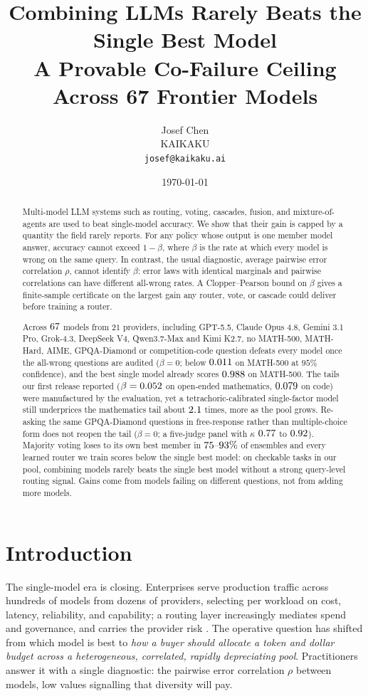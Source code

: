 \documentclass[11pt]{article}
\title{\bfseries Combining LLMs Rarely Beats the Single Best Model\\[4pt]
{\large\mdseries A Provable Co-Failure Ceiling Across 67 Frontier Models}}
\author{Josef Chen\\ KAIKAKU\\ \texttt{josef@kaikaku.ai}}
\date{\today}
\theoremstyle{plain}
\theoremstyle{definition}
\begin{document}
\maketitle

\begin{abstract}
Multi-model LLM systems such as routing, voting, cascades, fusion, and mixture-of-agents are used to beat single-model
accuracy. We show that their gain is capped by a quantity the field rarely reports. For any policy whose output is one
member model answer, accuracy cannot exceed $1-\beta$, where $\beta$ is the rate at which every model is wrong on the same
query. In contrast, the usual diagnostic, average pairwise error correlation $\rho$, cannot identify $\beta$: error laws
with identical marginals and pairwise correlations can have different all-wrong rates. A Clopper--Pearson bound on $\beta$
gives a finite-sample certificate on the largest gain any router, vote, or cascade could deliver before training a router.

Across $67$ models from $21$ providers, including GPT-5.5, Claude Opus 4.8, Gemini 3.1 Pro, Grok-4.3, DeepSeek V4,
Qwen3.7-Max and Kimi K2.7, no MATH-500, MATH-Hard, AIME, GPQA-Diamond or competition-code question defeats every model
once the all-wrong questions are audited ($\beta=0$; below $0.011$ on MATH-500 at $95\%$ confidence), and the best
single model already scores $0.988$ on MATH-500. The tails our first release reported ($\beta=0.052$ on
open-ended mathematics, $0.079$ on code) were manufactured by the evaluation, yet a tetrachoric-calibrated
single-factor model still underprices the mathematics tail about $2.1$ times, more as the pool grows. Re-asking
the same GPQA-Diamond questions in free-response rather than multiple-choice form does not reopen the tail ($\beta=0$; a
five-judge panel with $\kappa$ $0.77$ to $0.92$). Majority voting loses to its own best member in
$75$--$93\%$ of ensembles and every learned router we train scores below the single best model: on
checkable tasks in our pool, combining models rarely beats the single best model without a strong query-level routing
signal. Gains come from models failing on different questions, not from adding more models.
\end{abstract}

\section{Introduction}
The single-model era is closing. Enterprises serve production traffic across hundreds of models from dozens of
providers, selecting per workload on cost, latency, reliability, and capability; a routing layer increasingly
mediates spend and governance, and carries the provider risk \citep{ong2024routellm,hu2024routerbench,chen2023frugalgpt}. The
operative question has shifted from which model is best to \emph{how a buyer should allocate a token and
dollar budget across a heterogeneous, correlated, rapidly depreciating pool}. Practitioners answer it with a single
diagnostic: the pairwise error correlation $\rho$ between models, low values signalling that diversity will pay.
\end{document}
